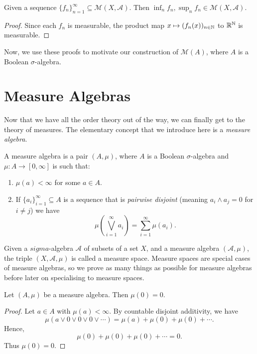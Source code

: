 \documentclass{owmaths}
\begin{document}
\begin{proposition}
    Given a sequence $\{f_n\}_{n=1}^\infty \subseteq \mathcal{M}(X,\mathcal{A})$.
    Then $\inf_{n} f_n ,\sup_n f_n \in \mathcal{M}(X,\mathcal{A})$.
\end{proposition}
\begin{proof}
    Since each $f_n$ is measurable, the product map $x\mapsto (f_n(x))_{n\in\mathbb{N}}$
    to $\mathbb{R}^{\mathbb{N}}$ is measurable. 
\end{proof}

Now, we use these proofs to motivate our construction of $\mathcal{M}(A)$,
where $A$ is a Boolean $\sigma$-algebra.

\section{Measure Algebras}
Now that we have all the order theory out of the way, we can finally
get to the theory of measures. The elementary concept
that we introduce here is a \emph{measure algebra}.
\begin{definition}
    A measure algebra is a pair $(A,\mu)$, where $A$ is a Boolean $\sigma$-algebra and
     $\mu:A\rightarrow[0,\infty]$ is such that:
    \begin{enumerate}
        \item{} $\mu(a) < \infty$ for some $a \in A$.
        \item{} If $\{a_i\}_{i=1}^\infty \subseteq A$ is a sequence that is
        \emph{pairwise disjoint} (meaning $a_i \wedge a_j = 0$ for $i\neq j$)
        we have
        \begin{equation*}
            \mu\left(\bigvee_{i=1}^\infty a_i\right) = \sum_{i=1}^\infty \mu(a_i).
        \end{equation*}
    \end{enumerate}
\end{definition}
\begin{remark}
    Given a $sigma$-algebra $\mathcal{A}$ of subsets of a set $X$, and a measure
    algebra $(\mathcal{A},\mu)$, the triple $(X,\mathcal{A},\mu)$ is called a measure
    space. Measure spaces are special cases of measure algebras, so we prove
    as many things as possible for measure algebras before later on specialising
    to measure spaces.
\end{remark}
\begin{proposition}
    Let $(A,\mu)$ be a measure algebra. Then $\mu(0) = 0$. 
\end{proposition}
\begin{proof}
    Let $a \in A$ with $\mu(a) < \infty$. By countable disjoint additivity, we have
    \begin{equation*}
        \mu(a\vee 0 \vee 0 \vee 0 \vee \cdots) = \mu(a) + \mu(0) + \mu(0) + \cdots.
    \end{equation*}
    Hence,
    \begin{equation*}
        \mu(0) + \mu(0) + \mu(0) + \cdots = 0.
    \end{equation*}
    Thus $\mu(0) = 0$.
\end{proof}
\end{document}
